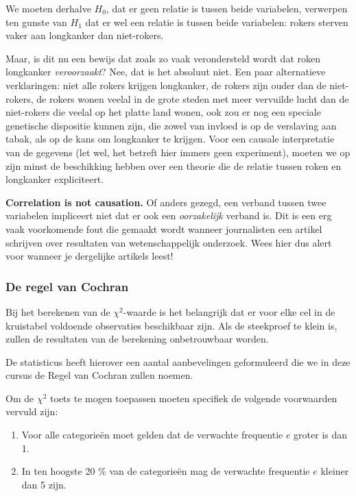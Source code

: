 We moeten derhalve $H_{0}$, dat er geen relatie is tussen beide variabelen, verwerpen ten gunste van $H_{1}$ dat er wel een relatie is tussen beide variabelen: rokers sterven vaker aan longkanker dan niet-rokers.

Maar, is dit nu een bewijs dat zoals zo vaak verondersteld wordt dat roken longkanker \emph{veroorzaakt}? Nee, dat is het absoluut niet. Een paar alternatieve verklaringen: niet alle rokers krijgen longkanker, de rokers zijn ouder dan de niet-rokers, de rokers wonen veelal in de grote steden met meer vervuilde lucht dan de niet-rokers die veelal op het platte land wonen, ook zou er nog een speciale genetische dispositie kunnen zijn, die zowel van invloed is op de verslaving aan tabak, als op de kans om longkanker te krijgen. Voor een causale interpretatie van de gegevens (let wel, het betreft hier immers geen experiment), moeten we op zijn minst de beschikking hebben over een theorie die de relatie tussen roken en longkanker expliciteert.

\begin{remark}[!!]
  \textbf{Correlation is not causation.} Of anders gezegd, een verband tussen twee variabelen impliceert niet dat er ook een \emph{oorzakelijk} verband is. Dit is een erg vaak voorkomende fout die gemaakt wordt wanneer journalisten een artikel schrijven over resultaten van wetenschappelijk onderzoek. Wees hier dus alert voor wanneer je dergelijke artikels leest!
\end{remark}

\subsubsection{De regel van Cochran}

Bij het berekenen van de $\chi^2$-waarde is het belangrijk dat er voor elke cel in de kruistabel voldoende observaties beschikbaar zijn. Als de steekproef te klein is, zullen de resultaten van de berekening onbetrouwbaar worden.

De statisticus \textcite{Cochran1954} heeft hierover een aantal aanbevelingen geformuleerd die we in deze cursus de Regel van Cochran zullen noemen.

Om de $\chi^2$ toets te mogen toepassen moeten specifiek de volgende voorwaarden vervuld zijn:

\begin{enumerate}
  \item Voor alle categorie\"en moet gelden dat de verwachte frequentie $e$ groter is dan 1.
  \item In ten hoogste 20 \% van de categorie\"en mag de verwachte frequentie $e$ kleiner dan 5 zijn.
\end{enumerate}

